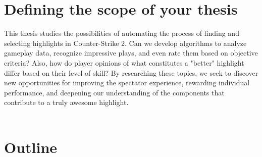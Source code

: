 \section{Defining the scope of your thesis}
This thesis studies the possibilities of automating the process of finding and selecting highlights in Counter-Strike 2.  Can we develop algorithms to analyze gameplay data, recognize impressive plays, and even rate them based on objective criteria?  Also, how do player opinions of what constitutes a "better" highlight differ based on their level of skill?  By researching these topics, we seek to discover new opportunities for improving the spectator experience, rewarding individual performance, and deepening our understanding of the components that contribute to a truly awesome highlight.
\\\\
\section{Outline}
